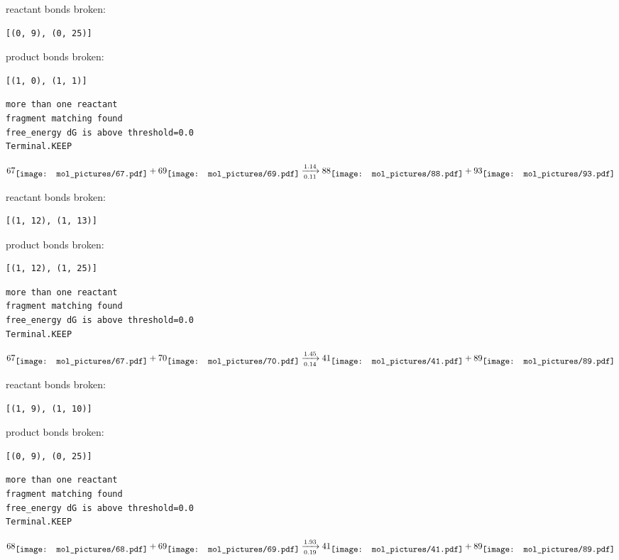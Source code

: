 \documentclass{article}
\begin{document}
reactant bonds broken:\begin{verbatim}
[(0, 9), (0, 25)]
\end{verbatim}
product bonds broken:\begin{verbatim}
[(1, 0), (1, 1)]
\end{verbatim}




\vspace{1cm}
\begin{verbatim}
more than one reactant
fragment matching found
free_energy dG is above threshold=0.0
Terminal.KEEP
\end{verbatim}
$$
67
\raisebox{-.5\height}{\texttt{[image: mol\_pictures/67.pdf]}}
+
69
\raisebox{-.5\height}{\texttt{[image: mol\_pictures/69.pdf]}}
\xrightarrow[0.11]{1.14}
88
\raisebox{-.5\height}{\texttt{[image: mol\_pictures/88.pdf]}}
+
93
\raisebox{-.5\height}{\texttt{[image: mol\_pictures/93.pdf]}}
$$


reactant bonds broken:\begin{verbatim}
[(1, 12), (1, 13)]
\end{verbatim}
product bonds broken:\begin{verbatim}
[(1, 12), (1, 25)]
\end{verbatim}




\vspace{1cm}
\begin{verbatim}
more than one reactant
fragment matching found
free_energy dG is above threshold=0.0
Terminal.KEEP
\end{verbatim}
$$
67
\raisebox{-.5\height}{\texttt{[image: mol\_pictures/67.pdf]}}
+
70
\raisebox{-.5\height}{\texttt{[image: mol\_pictures/70.pdf]}}
\xrightarrow[0.14]{1.45}
41
\raisebox{-.5\height}{\texttt{[image: mol\_pictures/41.pdf]}}
+
89
\raisebox{-.5\height}{\texttt{[image: mol\_pictures/89.pdf]}}
$$


reactant bonds broken:\begin{verbatim}
[(1, 9), (1, 10)]
\end{verbatim}
product bonds broken:\begin{verbatim}
[(0, 9), (0, 25)]
\end{verbatim}




\vspace{1cm}
\begin{verbatim}
more than one reactant
fragment matching found
free_energy dG is above threshold=0.0
Terminal.KEEP
\end{verbatim}
$$
68
\raisebox{-.5\height}{\texttt{[image: mol\_pictures/68.pdf]}}
+
69
\raisebox{-.5\height}{\texttt{[image: mol\_pictures/69.pdf]}}
\xrightarrow[0.19]{1.93}
41
\raisebox{-.5\height}{\texttt{[image: mol\_pictures/41.pdf]}}
+
89
\raisebox{-.5\height}{\texttt{[image: mol\_pictures/89.pdf]}}
$$
\end{document}
